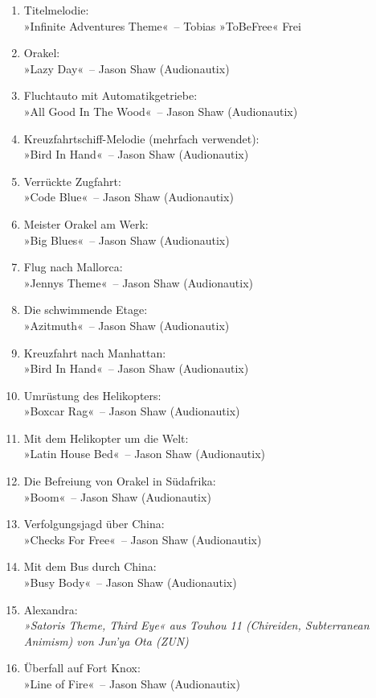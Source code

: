 \begin{enumerate}
    \item Titelmelodie:\\ »Infinite Adventures Theme«~– Tobias »ToBeFree« Frei
    \item Orakel:\\ »Lazy Day«~– Jason Shaw (Audionautix)
    \item Fluchtauto mit Automatikgetriebe:\\ »All Good In The Wood«~– Jason Shaw (Audionautix)
    \item Kreuzfahrtschiff-Melodie (mehrfach verwendet):\\ »Bird In Hand«~– Jason Shaw (Audionautix)
    \item Verrückte Zugfahrt:\\ »Code Blue«~– Jason Shaw (Audionautix)
    \item Meister Orakel am Werk:\\ »Big Blues«~– Jason Shaw (Audionautix)
    \item Flug nach Mallorca:\\ »Jennys Theme«~– Jason Shaw (Audionautix)
    \item Die schwimmende Etage:\\ »Azitmuth«~– Jason Shaw (Audionautix)
    \item Kreuzfahrt nach Manhattan:\\ »Bird In Hand«~– Jason Shaw (Audionautix)
    \item Umrüstung des Helikopters:\\ »Boxcar Rag«~– Jason Shaw (Audionautix)
    \item Mit dem Helikopter um die Welt:\\ »Latin House Bed«~– Jason Shaw (Audionautix)
    \item Die Befreiung von Orakel in Südafrika:\\ »Boom«~– Jason Shaw (Audionautix)
    \item Verfolgungsjagd über China:\\ »Checks For Free«~– Jason Shaw (Audionautix)
    \item Mit dem Bus durch China:\\ »Busy Body«~– Jason Shaw (Audionautix)
    \item Alexandra:\\ \textit{»Satoris Theme, Third Eye« aus Touhou 11 (Chireiden, Subterranean Animism) von Jun'ya Ota (ZUN)}
    \item Überfall auf Fort Knox:\\ »Line of Fire«~– Jason Shaw (Audionautix)

\end{enumerate}
